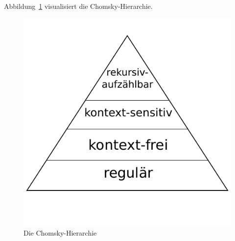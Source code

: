 Abbildung~\ref{fig:chomsky_hierarchy} visualisiert die Chomsky-Hierarchie.
%
\begin{figure}[h]
 \begin{center}
  \includegraphics{img/chomsky_hierarchy.pdf}
  \caption{Die Chomsky-Hierarchie}
  \label{fig:chomsky_hierarchy}
 \end{center}
\end{figure}
